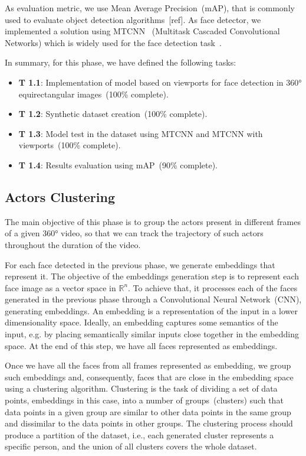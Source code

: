 As evaluation metric, we use Mean Average Precision~(mAP), that is commonly used to evaluate object detection algorithms~[ref]. As face detector, we implemented a solution using MTCNN~\cite{mtcnn} (Multitask Cascaded Convolutional Networks) which is widely used for the face detection task~\cite{mtcnn1, mtcnn2, mtcnn3}. %

In summary, for this phase, we have defined the following tasks:

\begin{itemize}
    \item \textbf{T 1.1}: Implementation of model based on viewports for face detection in 360° equirectangular images~(100\% complete).
    \item \textbf{T 1.2}: Synthetic dataset creation~(100\% complete).
    \item \textbf{T 1.3}: Model test in the dataset using MTCNN and MTCNN with viewports~(100\% complete).
    \item \textbf{T 1.4}: Results evaluation using mAP~(90\% complete).
\end{itemize}


\subsection{Actors Clustering}

The main objective of this phase is to group the actors present in different frames of a given 360° video, so that we can track the trajectory of such actors throughout the duration of the video. 

For each face detected in the previous phase, we generate embeddings that represent it.
The objective of the embeddings generation step is to represent each face image as a vector space in $\mathbb{R}^{n}$.
To achieve that, it processes each of the faces generated in the previous phase through a Convolutional Neural Network~(CNN), generating embeddings. 
An embedding is a representation of the input in a lower dimensionality space.
Ideally, an embedding captures some semantics of the input, e.g. by placing semantically similar inputs close together in the embedding space.
%
At the end of this step, we have all faces represented as embeddings.

Once we have all the faces from all frames represented as embedding, we group such embeddings and, consequently, faces that are close in the embedding space using a clustering algorithm. 
%
Clustering is the task of dividing a set of data points, embeddings in this case, into a number of groups~(clusters) such that data points in a given group are similar to other data points in the same group and dissimilar to the data points in other groups.
The clustering process should produce a partition of the dataset, i.e., each generated cluster represents a specific person, and the union of all clusters covers the whole dataset.

